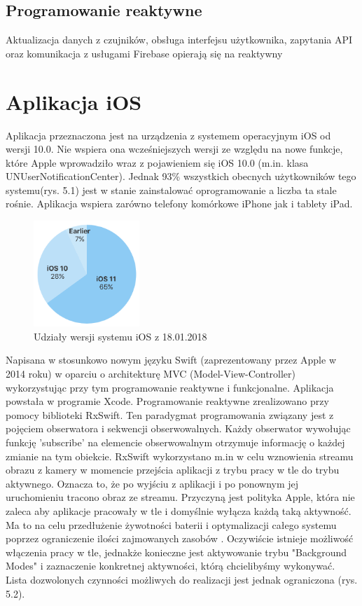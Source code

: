 \subsection{Programowanie reaktywne}
Aktualizacja danych z czujników, obsługa interfejsu użytkownika, zapytania API oraz komunikacja z usługami Firebase opierają się na reaktywny

\section{Aplikacja iOS}
Aplikacja przeznaczona jest na urządzenia z systemem operacyjnym iOS od wersji 10.0. 
Nie wspiera ona wcześniejszych wersji ze względu na nowe funkcje, które Apple wprowadziło wraz z pojawieniem się iOS 10.0 (m.in. klasa UNUserNotificationCenter). Jednak 93\% wszystkich obecnych użytkowników tego systemu(rys. 5.1) jest w stanie zainstalować oprogramowanie a liczba ta stale rośnie. Aplikacja wspiera zarówno telefony komórkowe iPhone jak i tablety iPad. 
\begin{figure}[ht]
	\centering
	\includegraphics[width=4cm]{ios_screenshots/iOSstat.png}
	\caption{Udziały wersji systemu iOS z 18.01.2018 \protect\cite{iosversions}}
\end{figure}
Napisana w stosunkowo nowym języku Swift (zaprezentowany przez Apple w 2014 roku) w oparciu o architekturę MVC (Model-View-Controller) wykorzystując przy tym programowanie reaktywne i funkcjonalne. Aplikacja powstała w programie Xcode. Programowanie reaktywne zrealizowano przy pomocy biblioteki RxSwift. Ten paradygmat programowania związany jest z pojęciem obserwatora i sekwencji obserwowalnych. Każdy obserwator wywołując funkcję 'subscribe' na elemencie obserwowalnym otrzymuje informację o każdej zmianie na tym obiekcie. RxSwift wykorzystano m.in w celu wznowienia streamu obrazu z kamery w momencie przejścia aplikacji z trybu pracy w tle do trybu aktywnego. Oznacza to, że po wyjściu z aplikacji i po ponownym jej uruchomieniu tracono obraz ze streamu. Przyczyną jest polityka Apple, która nie zaleca aby aplikacje pracowały w tle i domyślnie wyłącza każdą taką aktywność. Ma to na celu przedłużenie żywotności baterii i optymalizacji całego systemu poprzez ograniczenie ilości zajmowanych zasobów \cite{backgroundmodes}.  Oczywiście istnieje możliwość włączenia pracy w tle, jednakże konieczne jest aktywowanie trybu "Background Modes" i zaznaczenie konkretnej aktywności, którą chcielibyśmy wykonywać. Lista dozwolonych czynności możliwych do realizacji jest jednak ograniczona (rys. 5.2). 
